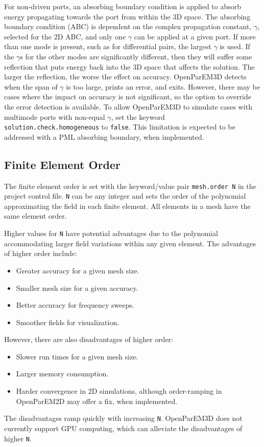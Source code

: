 \documentclass[titlepage]{article}
\renewcommand\_{\textunderscore\linebreak[1]}
\begin{document}
For non-driven ports, an absorbing boundary condition is applied to absorb energy propagating towards the port from within the 3D space.  The absorbing boundary condition (ABC) is dependent on the complex propagation constant, $\gamma$, selected for the 2D ABC, and only one $\gamma$ can be applied at a given port.  If more than one mode is present, such as for differential pairs, the largest $\gamma$ is used.  If the $\gamma$s for the other modes are significantly different, then they will suffer some reflection that puts energy back into the 3D space that affects the solution.  The larger the reflection, the worse the effect on accuracy.  OpenParEM3D detects when the span of $\gamma$ is too large, prints an error, and exits.  However, there may be cases where the impact on accuracy is not significant, so the option to override the error detection is available.  To allow OpenParEM3D to simulate cases with multimode ports with non-equal $\gamma$, set the keyword \texttt{solution.check.homogeneous} to \texttt{false}.  This limitation is expected to be addressed with a PML absorbing boundary, when implemented.

\subsection{Finite Element Order}

The finite element order is set with the keyword/value pair \texttt{mesh.order N} in the project control file.  \texttt{N} can be any integer and sets the order of the polynomial approximating the field in each finite element.  All elements in a mesh have the same element order.

Higher values for \texttt{N} have potential advantages due to the polynomial accommodating larger field variations within any given element.  The advantages of higher order include:
\begin{itemize}
\item Greater accuracy for a given mesh size.
\item Smaller mesh size for a given accuracy.
\item Better accuracy for frequency sweeps.
\item Smoother fields for visualization.
\end{itemize}
\noindent However, there are also disadvantages of higher order:
\begin{itemize}
\item Slower run times for a given mesh size.
\item Larger memory consumption.
\item Harder convergence in 2D simulations, although order-ramping in OpenParEM2D may offer a fix, when implemented.
\end{itemize}
\noindent The disadvantages ramp quickly with increasing \texttt{N}.
OpenParEM3D does not currently support GPU computing, which can alleviate the disadvantages of higher \texttt{N}.
\end{document}
